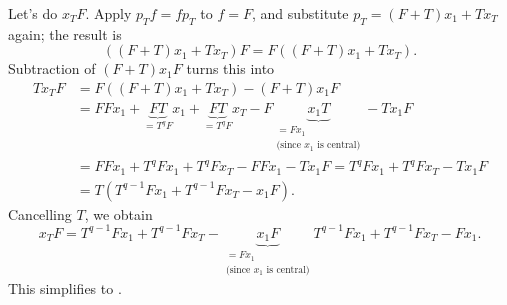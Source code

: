 \documentclass[numbers=enddot,12pt,final,onecolumn,notitlepage]{scrartcl}%
\theoremstyle{definition}
\begin{document}
Let's do $x_{T}F$. Apply $p_{T}f=fp_{T}$ to $f=F$, and substitute
$p_{T}=\left(  F+T\right)  x_{1}+Tx_{T}$ again; the result is%
\[
\left(  \left(  F+T\right)  x_{1}+Tx_{T}\right)  F=F\left(  \left(
F+T\right)  x_{1}+Tx_{T}\right)  .
\]
Subtraction of $\left(  F+T\right)  x_{1}F$ turns this into
\begin{align*}
Tx_{T}F  &  =F\left(  \left(  F+T\right)  x_{1}+Tx_{T}\right)  -\left(
F+T\right)  x_{1}F\\
&  =FFx_{1}+\underbrace{FT}_{=T^{q}F}x_{1}+\underbrace{FT}_{=T^{q}F}%
x_{T}-F\underbrace{x_{1}T}_{\substack{=Fx_{1}\\\text{(since }x_{1}\text{ is
central)}}}-Tx_{1}F\\
&  =FFx_{1}+T^{q}Fx_{1}+T^{q}Fx_{T}-FFx_{1}-Tx_{1}F=T^{q}Fx_{1}+T^{q}%
Fx_{T}-Tx_{1}F\\
&  =T\left(  T^{q-1}Fx_{1}+T^{q-1}Fx_{T}-x_{1}F\right)  .
\end{align*}
Cancelling $T$, we obtain%
\[
x_{T}F=T^{q-1}Fx_{1}+T^{q-1}Fx_{T}-\underbrace{x_{1}F}_{\substack{=Fx_{1}%
\\\text{(since }x_{1}\text{ is central)}}}T^{q-1}Fx_{1}+T^{q-1}Fx_{T}-Fx_{1}.
\]
This simplifies to .
\end{document}

